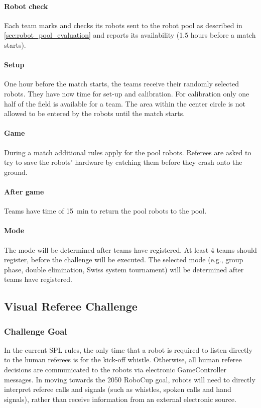             \paragraph{Robot check} Each team marks and checks its robots sent to the robot pool as described in \cref{sec:robot_pool_evaluation} and reports its availability (1.5 hours before a match starts).
            \paragraph{Setup} One hour before the match starts, the teams receive their randomly selected robots. They have now time for set-up and calibration. For calibration only one half of the field is available for a team. The area within the center circle is not allowed to be entered by the robots until the match starts.
            \paragraph{Game} During a match additional rules apply for the pool robots. Referees are asked to try to save the robots' hardware by catching them before they crash onto the ground.
            \paragraph{After game} Teams have time of \qty{15}{\minute} to return the pool robots to the pool.

        \paragraph{Mode}
            The mode will be determined after teams have registered. At least 4 teams should register, before the challenge will be executed. The selected mode (e.g., group phase, double elimination, Swiss system tournament) will be determined after teams have registered.

\newpage

\subsection{Visual Referee Challenge}

    \subsubsection{Challenge Goal}

        In the current SPL rules, the only time that a robot is required to listen directly to the human referees is for the kick-off whistle. Otherwise, all human referee decisions are communicated to the robots via electronic GameController messages. In moving towards the 2050 RoboCup goal, robots will need to directly interpret referee calls and signals (such as whistles, spoken calls and hand signals), rather than receive information from an external electronic source.
        
